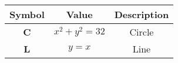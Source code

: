 \begin{tabular}[12pt]{ |c|c|c|}
    \hline
    \textbf{Symbol} & \textbf{Value} & \textbf{Description} \\
    \hline
    \textbf{C} & $x^{2}+y^{2}=32$ & Circle\\
    \hline
    \textbf{L} & $y=x$ & Line\\
    \hline
    \end{tabular}
